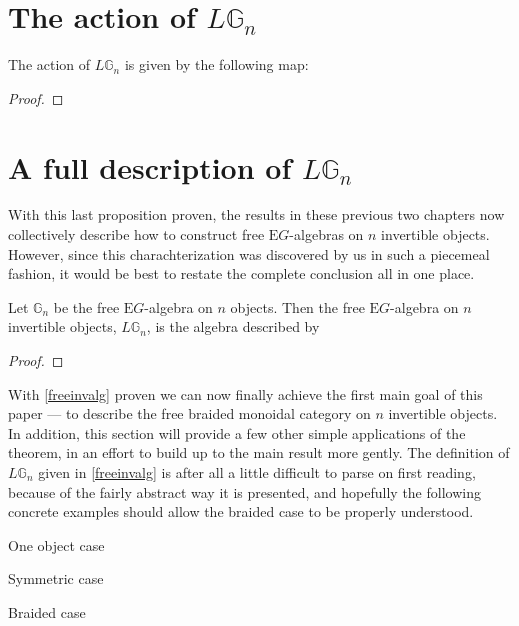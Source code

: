 \section{The action of $L\mathbb{G}_n$} 

\begin{prop} The action of $L\mathbb{G}_n$ is given by the following map:
\end{prop}
\begin{proof}
\end{proof}

\section{A full description of $L\mathbb{G}_n$}

With this last proposition proven, the results in these previous two chapters now collectively describe how to construct free $\mathrm{E}G$-algebras on $n$ invertible objects. However, since this charachterization was discovered by us in such a piecemeal fashion, it would be best to restate the complete conclusion all in one place.

\begin{thm}\label{freeinvalg} Let $\mathbb{G}_n$ be the free $\mathrm{E}G$-algebra on $n$ objects. Then the free $\mathrm{E}G$-algebra on $n$ invertible objects, $L\mathbb{G}_n$, is the algebra described by
\end{thm}
\begin{proof}
\end{proof}

With \cref{freeinvalg} proven we can now finally achieve the first main goal of this paper --- to describe the free braided monoidal category on $n$ invertible objects. In addition, this section will provide a few other simple applications of the theorem, in an effort to build up to the main result more gently. The definition of $L\mathbb{G}_n$ given in \ref{freeinvalg} is after all a little difficult to parse on first reading, because of the fairly abstract way it is presented, and hopefully the following concrete examples should allow the braided case to be properly understood.

\begin{prop} One object case
\end{prop}

\begin{prop} Symmetric case
\end{prop}

\begin{prop} Braided case
\end{prop}

